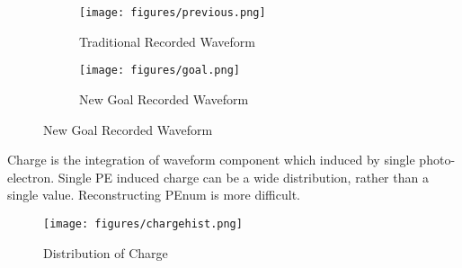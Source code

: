 \begin{figure}[H]
\begin{minipage}{.5\textwidth}
\begin{figure}[H]
    \centering
    \caption{Traditional Recorded Waveform}
    \texttt{[image: figures/previous.png]}
    \label{fig:tradi}
\end{figure}
\end{minipage}
\begin{minipage}{.5\textwidth}
\begin{figure}[H]
    \centering
    \caption{New Goal Recorded Waveform}
    \texttt{[image: figures/goal.png]}
    \label{fig:new}
\end{figure}
\end{minipage}
\end{figure}

Charge is the integration of waveform component which induced by single photo-electron. Single PE induced charge can be a wide distribution, rather than a single value. Reconstructing PEnum is more difficult. 

\begin{figure}[H]
    \centering
    \caption{Distribution of Charge}
    \texttt{[image: figures/chargehist.png]}
    \label{fig:charge}
\end{figure}

